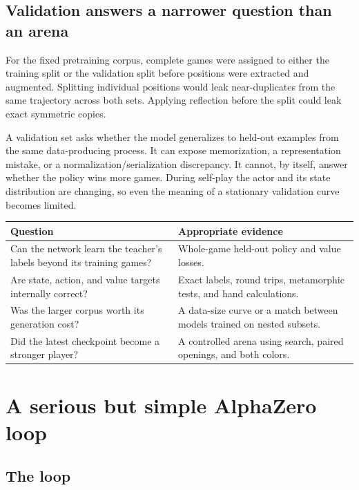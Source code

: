 \documentclass[10.5pt,letterpaper]{article}
\begin{document}
\subsection{Validation answers a narrower question than an arena}

For the fixed pretraining corpus, complete games were assigned to either the
training split or the validation split before positions were extracted and
augmented. Splitting individual positions would leak near-duplicates from the
same trajectory across both sets. Applying reflection before the split could
leak exact symmetric copies.

A validation set asks whether the model generalizes to held-out examples from
the same data-producing process. It can expose memorization, a representation
mistake, or a normalization/serialization discrepancy. It cannot, by itself,
answer whether the policy wins more games. During self-play the actor and its
state distribution are changing, so even the meaning of a stationary
validation curve becomes limited.

\begin{center}
\small
\begin{tabularx}{\textwidth}{Y Y}
\toprule
\sffamily\bfseries Question & \sffamily\bfseries Appropriate evidence \\
\midrule
Can the network learn the teacher's labels beyond its training games? &
Whole-game held-out policy and value losses. \\
Are state, action, and value targets internally correct? &
Exact labels, round trips, metamorphic tests, and hand calculations. \\
Was the larger corpus worth its generation cost? &
A data-size curve or a match between models trained on nested subsets. \\
Did the latest checkpoint become a stronger player? &
A controlled arena using search, paired openings, and both colors. \\
\bottomrule
\end{tabularx}
\end{center}

\section{A serious but simple AlphaZero loop}

\subsection{The loop}
\end{document}
